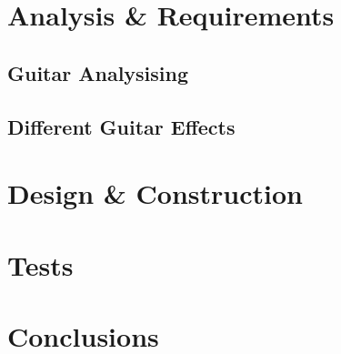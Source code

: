 %
\part{Analysis \& Requirements}\label{pt:analysis} \glsresetall
 \graphicspath{{figures/analysing/}}
 \chapter{Guitar Analysising}\label{ch:analysing}
 \label{sec:electric_guitar_theory} 

\chapter{Different Guitar Effects}
 \label{sec:effects}

 \label{sec:FPGA}

\part{Design \& Construction}\label{pt:design} 
 
%
\part{Tests}\label{pt:tests} 
\part{Conclusions}\label{pt:conclusions} 
%

